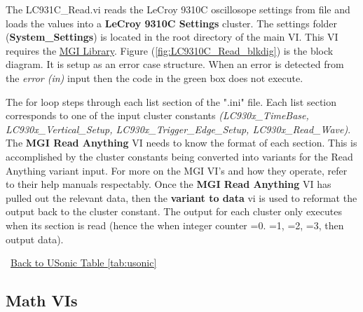 \documentclass[11pt,a4paper,oldfontcommands]{memoir}
\begin{document}
The LC931C\_Read.vi reads the LeCroy 9310C oscillosope settings from file and loads the values into a \textbf{LeCroy 9310C Settings} cluster. The settings folder (\textbf{System\_Settings}) is located in the root directory of the main VI. This VI requires the \href{http://sine.ni.com/nips/cds/view/p/lang/en/nid/209753}{MGI Library}. Figure (\ref{fig:LC9310C_Read_blkdig}) is the block diagram.  It is setup as an error case structure. When an error is detected from the \textit{error (in)} input then the code in the green box does not execute.

The for loop steps through each list section of the ".ini" file. Each list section corresponds to one of the input cluster constants \textit{(LC930x\_TimeBase, LC930x\_Vertical\_Setup, LC930x\_Trigger\_Edge\_Setup, LC930x\_Read\_Wave)}. The \textbf{MGI Read Anything} VI needs to know the format of each section. This is accomplished by the cluster constants being converted into variants for the Read Anything variant input.  For more on the MGI VI's and how they operate, refer to their help manuals respectably. Once the \textbf{MGI Read Anything} VI has pulled out the relevant data, then the \textbf{variant to data} vi is used to reformat the output back to the cluster constant. The output for each cluster only executes when its section is read (hence the when integer counter =0. =1, =2, =3, then output data).

\noindent\hrulefill\, \hyperref[tab:usonic]{Back to USonic Table \ref{tab:usonic}}

\newpage

\subsection{Math VIs}
\end{document}
